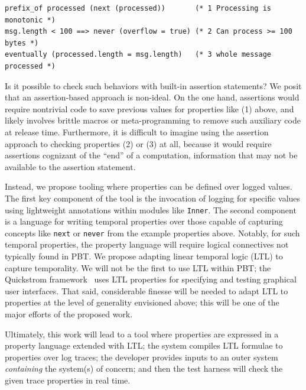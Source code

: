 \begin{lstlisting}
prefix_of processed (next (processed))       (* 1 Processing is monotonic *)
msg.length < 100 ==> never (overflow = true) (* 2 Can process >= 100 bytes *)
eventually (processed.length = msg.length)   (* 3 whole message processed *)
\end{lstlisting}

Is it possible to check such behaviors with built-in assertion statements? We
posit that an assertion-based approach is non-ideal. On the one hand, assertions
would require nontrivial code to save previous values for properties like (1)
above, and likely involves brittle macros or meta-programming to remove such
auxiliary code at release time. Furthermore, it is difficult to imagine using
the assertion approach to checking properties (2) or (3) at all, because it
would require assertions cognizant of the ``end'' of a computation, information
that may not be available to the assertion statement.

Instead, we propose tooling where properties can be defined over logged values.
The first key component of the tool is the invocation of
logging for specific values using lightweight annotations within modules like
\lstinline{Inner}. The second component is a language for writing temporal
properties over those capable of capturing concepts like \lstinline{next} or
\lstinline{never} from the example properties above. Notably, for such temporal
properties, the property language will require logical connectives not typically
found in PBT. We propose adapting linear temporal logic (LTL) to capture
temporality. We will not be the first to use LTL within PBT; the Quickstrom
framework~\cite{oconnor_quickstrom_2022} uses LTL properties
for specifying and testing graphical user interfaces. That said, considerable
finesse will be needed to adapt LTL to properties at the level of generality
envisioned above; this will be one of the major efforts of the proposed work.

Ultimately, this work will lead to a tool where properties are expressed in a
property language extended with LTL; the system compiles LTL formulae to
properties over log traces; the developer provides inputs to an outer system
\emph{containing} the system(s) of concern; and then the test harness will check
the given trace properties in real time.


